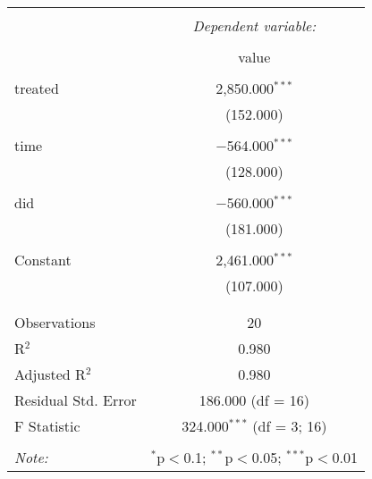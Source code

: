 
\begin{table}[!htbp] \centering 
  \caption{} 
  \label{} 
\begin{tabular}{@{\extracolsep{5pt}}lc} 
\\[-1.8ex]\hline 
\hline \\[-1.8ex] 
 & \multicolumn{1}{c}{\textit{Dependent variable:}} \\ 
\cline{2-2} 
\\[-1.8ex] & value \\ 
\hline \\[-1.8ex] 
 treated & 2,850.000$^{***}$ \\ 
  & (152.000) \\ 
  & \\ 
 time & $-$564.000$^{***}$ \\ 
  & (128.000) \\ 
  & \\ 
 did & $-$560.000$^{***}$ \\ 
  & (181.000) \\ 
  & \\ 
 Constant & 2,461.000$^{***}$ \\ 
  & (107.000) \\ 
  & \\ 
\hline \\[-1.8ex] 
Observations & 20 \\ 
R$^{2}$ & 0.980 \\ 
Adjusted R$^{2}$ & 0.980 \\ 
Residual Std. Error & 186.000 (df = 16) \\ 
F Statistic & 324.000$^{***}$ (df = 3; 16) \\ 
\hline 
\hline \\[-1.8ex] 
\textit{Note:}  & \multicolumn{1}{r}{$^{*}$p$<$0.1; $^{**}$p$<$0.05; $^{***}$p$<$0.01} \\ 
\end{tabular} 
\end{table} 
